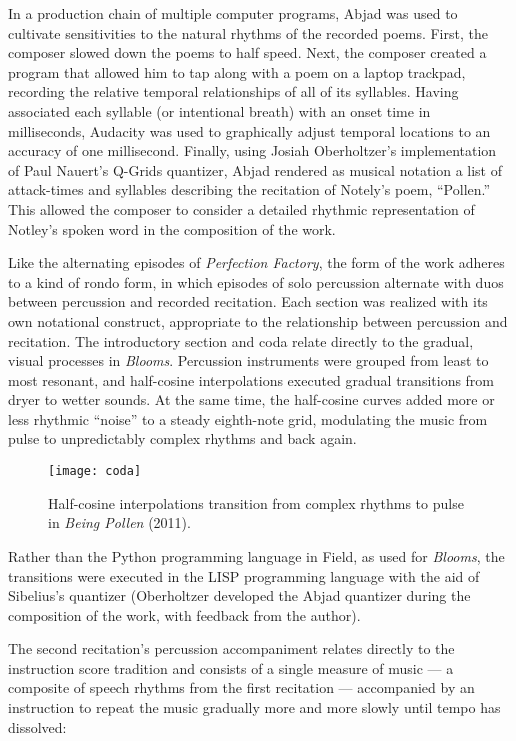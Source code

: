 In a production chain of multiple computer programs, Abjad was used to cultivate sensitivities to the natural rhythms of the recorded poems. First, the composer slowed down the poems to half speed. Next, the composer created a program that allowed him to tap along with a poem on a laptop trackpad, recording the relative temporal relationships of all of its syllables. Having associated each syllable (or intentional breath) with an onset time in milliseconds, Audacity was used to graphically adjust temporal locations to an accuracy of one millisecond. Finally, using Josiah Oberholtzer’s implementation of Paul Nauert’s Q-Grids quantizer, Abjad rendered as musical notation a list of attack-times and syllables describing the recitation of Notely's poem, ``Pollen.'' This allowed the composer to consider a detailed rhythmic representation of Notley’s spoken word in the composition of the work.

Like the alternating episodes of \emph{Perfection Factory}, the form of the work adheres to a kind of rondo form, in which episodes of solo percussion alternate with duos between percussion and recorded recitation. Each section was realized with its own notational construct, appropriate to the relationship between percussion and recitation. The introductory section and coda relate directly to the gradual, visual processes in \emph{Blooms}. Percussion instruments were grouped from least to most resonant, and half-cosine interpolations executed gradual transitions from dryer to wetter sounds. At the same time, the half-cosine curves added more or less rhythmic ``noise'' to a steady eighth-note grid, modulating the music from pulse to unpredictably complex rhythms and back again. 

\begin{figure}[H] 
\texttt{[image: coda]}
\caption{Half-cosine interpolations transition from complex rhythms to pulse in \emph{Being Pollen} (2011). }
\end{figure} 

Rather than the Python programming language in Field, as used for \emph{Blooms}, the transitions were executed in the LISP programming language with the aid of Sibelius's quantizer (Oberholtzer developed the Abjad quantizer during the composition of the work, with feedback from the author).  

The second recitation's percussion accompaniment relates directly to the instruction score tradition and consists of a single measure of music --- a composite of speech rhythms from the first recitation --- accompanied by an instruction to repeat the music gradually more and more slowly until tempo has dissolved:

